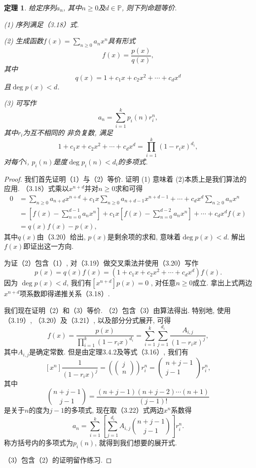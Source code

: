 \documentclass[a4paper,12pt]{ctexbook}
\newtheorem{theorem}[lemma]{\hspace{2em}定理}%
\begin{document}
\begin{theorem}
	给定序列$a_{n}$, 其中$n \geq 0$及$d \in \mathbb{P}$, 则下列命题等价.

	(1) 序列满足（3.18）式.

	(2) 生成函数$f(x)=\sum_{n \geq 0} a_{n} x^{n}$具有形式\[
	f(x)=\frac{p(x)}{q(x)},\tag{3.19}
	\]其中\[
	q(x)=1+c_{1} x+c_{2} x^{2}+\cdots+c_{d} x^{d}\tag{3.20}
	\]且$\operatorname{deg} p(x)<d$.

	(3)  可写作$$
	a_{n}=\sum_{i=1}^{k} p_{i}(n) r_{i}^{n},
	$$其中$r_{i}$为互不相同的 非负复数, 满足\[
	1+c_{1} x+c_{2} x^{2}+\cdots+c_{d} x^{d}=\prod_{i=1}^{k}\left(1-r_{i} x\right)^{d_{i}},\tag{3.21}
	\]对每个$i$,  $p_{i}(n)$是度$\operatorname{deg} p_{i}(n)<d_{i}$的多项式.
\end{theorem}
 \begin{proof}
 	我们首先证明（1）与（2）等价. 证明 (1) 意味着 (2)本质上是我们算法的应用. （3.18）式乘以$x^{n+d}$并对$n \geq 0$求和可得$$
 	\begin{aligned}
 	0 &=\sum_{n \geq 0} a_{n+d} x^{n+d}+c_{1} x \sum_{n \geq 0} a_{n+d-1} x^{n+d-1}+\cdots+c_{d} x^{d} \sum_{n \geq 0} a_{n} x^{n} \\
 	&=\left[f(x)-\sum_{n=0}^{d-1} a_{n} x^{n}\right]+c_{1} x\left[f(x)-\sum_{n=0}^{d-2} a_{n} x^{n}\right]+\cdots+c_{d} x^{d} f(x) \\
 	&=q(x) f(x)-p(x),
 	\end{aligned}
 	$$其中$q(x)$由（3.20）给出, $p(x)$是剩余项的求和, 意味着$\operatorname{deg} p(x)<d$. 解出$f(x)$即证出这一方向.

 	为证（2）包含（1）, 对（3.19）做交叉乘法并使用（3.20）写作$$
 	p(x)=q(x) f(x)=\left(1+c_{1} x+c_{2} x^{2}+\cdots+c_{d} x^{d}\right) f(x).
 	$$因为 $\operatorname{deg} p(x)<d$, 我们有$\left[x^{n+d}\right] p(x)=0$ , 对任意$n \geq 0$成立. 拿出上式两边$x^{n+d}$项系数即得递推关系（3.18）.

 	我们现在证明（2）和（3）等价. （2）包含（3）由算法得出. 特别地, 使用（3.19）, （3.20）及（3.21）, 以及部分分式展开, 可得\[
 	f(x)=\frac{p(x)}{\prod_{i=1}^{k}\left(1-r_{i} x\right)^{d_{i}}}=\sum_{i=1}^{k} \sum_{j=1}^{d_{i}} \frac{A_{i, j}}{\left(1-r_{i} x\right)^{j}},\tag{3.22}
 	\]其中$A_{i, j}$是确定常数. 但是由定理3.4.2及等式（3.16）, 我们有$$
 	\left[x^{n}\right] \frac{1}{\left(1-r_{i} x\right)^{j}}=\left(\left(\begin{array}{l}
 	j \\
 	n
 	\end{array}\right)\right) r_{i}^{n}=\left(\begin{array}{c}
 	n+j-1 \\
 	j-1
 	\end{array}\right) r_{i}^{n},
 	$$其中$$
 	\binom{n+j-1}{j-1}=\frac{(n+j-1)(n+j-2) \cdots(n+1)}{(j-1) !}
 	$$是关于$n$的度为$j-1$的多项式, 现在取（3.22）式两边$x^{n}$系数得$$
 	a_{n}=\sum_{i=1}^{k}\left[\sum_{j=1}^{d_{i}} A_{i, j}\binom{n+j-1}{j-1}\right] r_{i}^{n}.
 	$$称方括号内的多项式为$p_{i}(n)$, 就得到我们想要的展开式.

 	（3）包含（2）的证明留作练习.
 \end{proof}
\end{document}
